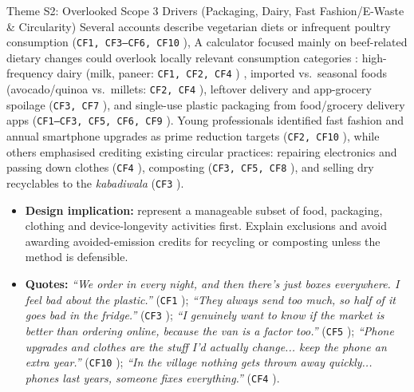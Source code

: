 \documentclass[12pt, a4paper]{article}
\begin{document}
\begin{semanticcard}{Theme S2: Overlooked Scope 3 Drivers (Packaging, Dairy, Fast Fashion/E-Waste \& Circularity)}
Several accounts describe vegetarian diets or infrequent poultry consumption (\texttt{CF1, CF3--CF6, CF10} \cite{cf1, cf3, cf4, cf5, cf6, cf10}), A calculator focused mainly on beef-related dietary changes could overlook locally relevant consumption categories \cite{shi2021, koide2019, hoffmann2024}: high-frequency dairy (milk, paneer: \texttt{CF1, CF2, CF4} \cite{cf1, cf2, cf4}) \cite{malan2020, hoffmann2024}, imported vs.\ seasonal foods (avocado/quinoa vs.\ millets: \texttt{CF2, CF4} \cite{cf2, cf4}), leftover delivery and app-grocery spoilage (\texttt{CF3, CF7} \cite{cf3, cf7}), and single-use plastic packaging from food/grocery delivery apps (\texttt{CF1--CF3, CF5, CF6, CF9} \cite{cf1, cf2, cf3, cf5, cf6, cf9}). Young professionals identified fast fashion and annual smartphone upgrades as prime reduction targets (\texttt{CF2, CF10} \cite{cf2, cf10}), while others emphasised crediting existing circular practices: repairing electronics and passing down clothes (\texttt{CF4} \cite{cf4}), composting (\texttt{CF3, CF5, CF8} \cite{cf3, cf5, cf8}), and selling dry recyclables to the \textit{kabadiwala} (\texttt{CF3} \cite{cf3}).
\begin{itemize}
    \item \textbf{Design implication:} represent a manageable subset of food, packaging, clothing and device-longevity activities first. Explain exclusions and avoid awarding avoided-emission credits for recycling or composting unless the method is defensible.
    \item \textbf{Quotes:} \textit{``We order in every night, and then there's just boxes everywhere. I feel bad about the plastic.''} (\texttt{CF1} \cite{cf1}); \textit{``They always send too much, so half of it goes bad in the fridge.''} (\texttt{CF3} \cite{cf3}); \textit{``I genuinely want to know if the market is better than ordering online, because the van is a factor too.''} (\texttt{CF5} \cite{cf5}); \textit{``Phone upgrades and clothes are the stuff I'd actually change... keep the phone an extra year.''} (\texttt{CF10} \cite{cf10}); \textit{``In the village nothing gets thrown away quickly... phones last years, someone fixes everything.''} (\texttt{CF4} \cite{cf4}).
\end{itemize}
\end{semanticcard}
\end{document}
